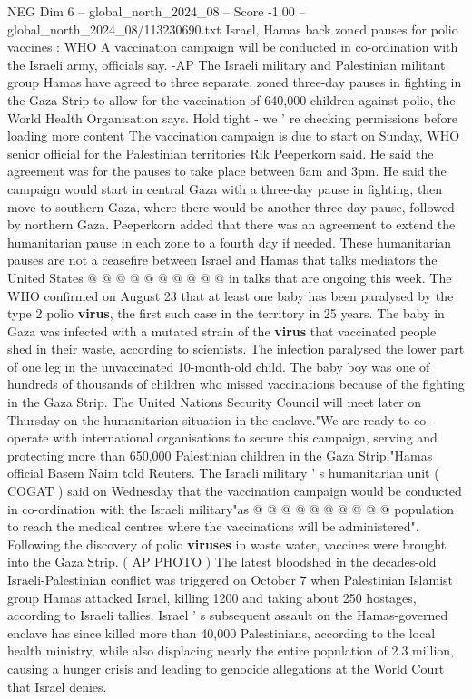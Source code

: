 \begin{textsample}{NEG Dim 6 – global\_north\_2024\_08 – Score -1.00 – global\_north\_2024\_08/113230690.txt}  \label{ex:f6_neg_074}
Israel, Hamas back zoned pauses for polio vaccines : WHO A vaccination campaign will be conducted in co-ordination with the Israeli army, officials say. -AP The Israeli military and Palestinian militant group Hamas have agreed to three separate, zoned three-day pauses in fighting in the Gaza Strip to allow for the vaccination of 640,000 children against polio, the World Health Organisation says.
Hold tight - we ' re checking permissions before loading more content The vaccination campaign is due to start on Sunday, WHO senior official for the Palestinian territories Rik Peeperkorn said.
He said the agreement was for the pauses to take place between 6am and 3pm.
He said the campaign would start in central Gaza with a three-day pause in fighting, then move to southern Gaza, where there would be another three-day pause, followed by northern Gaza.
Peeperkorn added that there was an agreement to extend the humanitarian pause in each zone to a fourth day if needed.
These humanitarian pauses are not a ceasefire between Israel and Hamas that talks mediators the United States @ @ @ @ @ @ @ @ @ @ in talks that are ongoing this week.
The WHO confirmed on August 23 that at least one baby has been paralysed by the type 2 polio \textbf{virus}, the first such case in the territory in 25 years.
The baby in Gaza was infected with a mutated strain of the \textbf{virus} that vaccinated people shed in their waste, according to scientists.
The infection paralysed the lower part of one leg in the unvaccinated 10-month-old child.
The baby boy was one of hundreds of thousands of children who missed vaccinations because of the fighting in the Gaza Strip.
The United Nations Security Council will meet later on Thursday on the humanitarian situation in the enclave."We are ready to co-operate with international organisations to secure this campaign, serving and protecting more than 650,000 Palestinian children in the Gaza Strip,"Hamas official Basem Naim told Reuters.
The Israeli military ' s humanitarian unit ( COGAT ) said on Wednesday that the vaccination campaign would be conducted in co-ordination with the Israeli military"as @ @ @ @ @ @ @ @ @ @ population to reach the medical centres where the vaccinations will be administered".
Following the discovery of polio \textbf{viruses} in waste water, vaccines were brought into the Gaza Strip. ( AP PHOTO ) The latest bloodshed in the decades-old Israeli-Palestinian conflict was triggered on October 7 when Palestinian Islamist group Hamas attacked Israel, killing 1200 and taking about 250 hostages, according to Israeli tallies.
Israel ' s subsequent assault on the Hamas-governed enclave has since killed more than 40,000 Palestinians, according to the local health ministry, while also displacing nearly the entire population of 2.3 million, causing a hunger crisis and leading to genocide allegations at the World Court that Israel denies.

\end{textsample}
